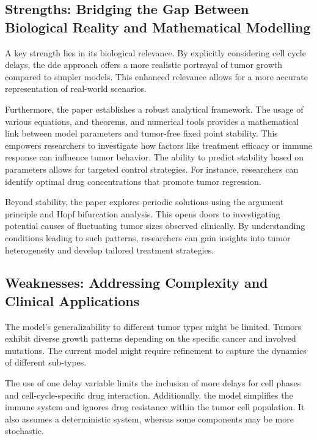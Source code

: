 \subsection{Strengths: Bridging the Gap Between Biological Reality and Mathematical Modelling}

A key strength lies in its biological relevance. By explicitly considering cell cycle delays, the \gls{dde} approach offers a more realistic portrayal of tumor growth compared to simpler models. This enhanced relevance allows for a more accurate representation of real-world scenarios.


Furthermore, the paper establishes a robust analytical framework.
The usage of various equations, and theorems, and numerical tools provides a mathematical link between model parameters and tumor-free fixed point stability. This empowers researchers to investigate how factors like treatment efficacy or immune response can influence tumor behavior. The ability to predict stability based on parameters allows for targeted control strategies. For instance, researchers can identify optimal drug concentrations that promote tumor regression.

Beyond stability, the paper explores periodic solutions using the argument principle and \gls{Hopf bifurcation} analysis. This opens doors to investigating potential causes of fluctuating tumor sizes observed clinically. By understanding conditions leading to such patterns, researchers can gain insights into tumor heterogeneity and develop tailored treatment strategies.

\subsection{Weaknesses: Addressing Complexity and Clinical Applications}

The model's generalizability to different tumor types might be limited. Tumors exhibit diverse growth patterns depending on the specific cancer and involved mutations. The current model might require refinement to capture the dynamics of different sub-types.

The use of one delay variable limits the inclusion of more delays for cell phases and cell-cycle-specific drug interaction. Additionally, the model simplifies the immune system and ignores drug resistance within the tumor cell population. It also assumes a \gls{deterministic system}, whereas some components may be more \gls{stochastic}.

